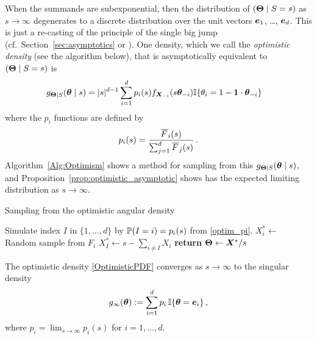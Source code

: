 When the summands are subexponential, then the distribution of $(\bm{\Theta} \mid S = s)$ as $s\to\infty$ degenerates to a discrete distribution over the unit vectors $\bm{e}_1$, \dots, $\bm{e}_d$. This is just a re-casting of the principle of the single big jump (cf.\ Section~\ref{sec:asymptotics} or \cite{foss2011introduction}). One density, which we call the \emph{optimistic density} (see the algorithm below), that is asymptotically equivalent to $(\bm{\Theta} \mid S = s)$ is
\begin{align} \label{OptimisticPDF}
g_{\bm{\Theta} \mid S}(\bm{\theta} \mid s)
&= |s|^{d-1} \sum_{i=1}^d p_i(s) f_{\bm{X}_{-i}}(s \bm{\theta}_{-i}) \mathbb{I}\{  \theta_i = 1-\bm{1} \cdot \bm{\theta}_{-i}  \}
\end{align}
where the $p_i$ functions are defined by
\begin{equation} \label{optim_pi}
p_i(s) = \frac{\Ftail _i(s)}{\sum_{j=1}^d \Ftail _j(s)} \,.
\end{equation}
Algorithm~\ref{Alg:Optimism} shows a method for sampling from this $g_{\bm{\Theta} \mid S}(\bm{\theta} \mid s)$, and Proposition~\ref{prop:optimistic_asymptotic} shows has the expected limiting distribution as $s \to \infty$.

\begin{algorithm}[H]
\caption{Sampling from the optimistic angular density}\label{Alg:Optimism}
\begin{algorithmic}[1]
\State Simulate index $I$ in $\{1, \dots, d\}$ by $\operatorname{{\mathbb P}}(I=i) = p_i(s)$ from \eqref{optim_pi}.
\State $X_i^* \gets$ Random sample from $F_i$
\EndFor
\State $X_I^* \gets s - \sum_{i \not= I} X_i$ 
\State \textbf{return} $\bm{\Theta} \gets \bm{X}^* / s$
\EndProcedure
\end{algorithmic}
\end{algorithm}

\begin{proposition} \label{prop:optimistic_asymptotic}

The optimistic density \eqref{OptimisticPDF} converges as $s \to \infty$ to the singular density
\begin{equation} \label{OptimisticLimitingDensity}
g_\infty(\bm{\theta}) := \sum_{i=1}^{d} p_i \, \mathbb{I}\{  \bm{\theta} = \bm{e}_i  \} \,,
\end{equation}
where $p_i = \lim_{s\to\infty} p_i(s)$ for $i=1,\dots,d$.
\end{proposition}

